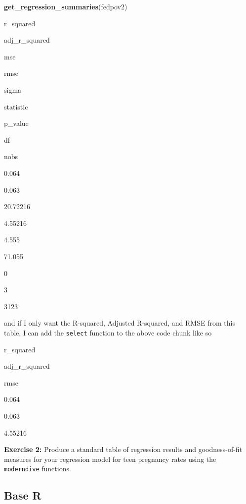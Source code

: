 \documentclass[
]{book}
\newenvironment{Shaded}{\begin{snugshade}}{\end{snugshade}}
\newcommand{\KeywordTok}[1]{\textcolor[rgb]{0.13,0.29,0.53}{\textbf{#1}}}
\newcommand{\NormalTok}[1]{#1}
\newcommand{\OperatorTok}[1]{\textcolor[rgb]{0.81,0.36,0.00}{\textbf{#1}}}
\newcommand{\StringTok}[1]{\textcolor[rgb]{0.31,0.60,0.02}{#1}}
\newenvironment{learncheck}%
{%
  \par\vspace{\baselineskip}\noindent 
  \color{Exercise}\begin{itshape}%
  \par\vspace{\baselineskip}\noindent\ignorespaces 
}%
{%
  \end{itshape}\ignorespacesafterend 
}
\begin{document}
\begin{Shaded}
\begin{Highlighting}[]
\KeywordTok{get_regression_summaries}\NormalTok{(fedpov2)}
\end{Highlighting}
\end{Shaded}

r\_squared

adj\_r\_squared

mse

rmse

sigma

statistic

p\_value

df

nobs

0.064

0.063

20.72216

4.55216

4.555

71.055

0

3

3123

and if I only want the R-squared, Adjusted R-squared, and RMSE from this table, I can add the \texttt{select} function to the above code chunk like so

\begin{Shaded}
\end{Shaded}

r\_squared

adj\_r\_squared

rmse

0.064

0.063

4.55216

\begin{learncheck}
\textbf{Exercise 2:} Produce a standard table of regression results and
goodness-of-fit measures for your regression model for teen pregnancy
rates using the \texttt{moderndive} functions.
\end{learncheck}

\hypertarget{base-r}{%
\subsection{Base R}\label{base-r}}
\end{document}
